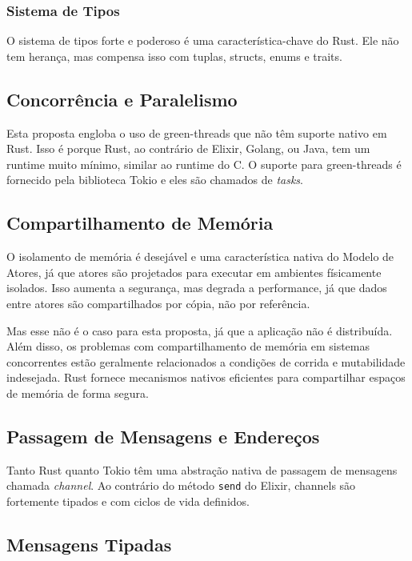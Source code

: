 \subsubsection{Sistema de Tipos}

O sistema de tipos forte e poderoso é uma característica-chave do Rust. Ele não tem herança, mas compensa isso com tuplas, structs, enums e traits.

\subsection{Concorrência e Paralelismo}

Esta proposta engloba o uso de green-threads que não têm suporte nativo em Rust. Isso é porque Rust, ao contrário de Elixir, Golang, ou Java, tem um runtime muito mínimo, similar ao runtime do C. O suporte para green-threads é fornecido pela biblioteca Tokio e eles são chamados de \emph{tasks}.

\subsection{Compartilhamento de Memória}

O isolamento de memória é desejável e uma característica nativa do Modelo de Atores, já que atores são projetados para executar em ambientes físicamente isolados. Isso aumenta a segurança, mas degrada a performance, já que dados entre atores são compartilhados por cópia, não por referência.

Mas esse não é o caso para esta proposta, já que a aplicação não é distribuída. Além disso, os problemas com compartilhamento de memória em sistemas concorrentes estão geralmente relacionados a condições de corrida e mutabilidade indesejada. Rust fornece mecanismos nativos eficientes para compartilhar espaços de memória de forma segura.

\subsection{Passagem de Mensagens e Endereços}

Tanto Rust quanto Tokio têm uma abstração nativa de passagem de mensagens chamada \emph{channel}. Ao contrário do método \texttt{send} do Elixir, channels são fortemente tipados e com ciclos de vida definidos.

\subsection{Mensagens Tipadas}

